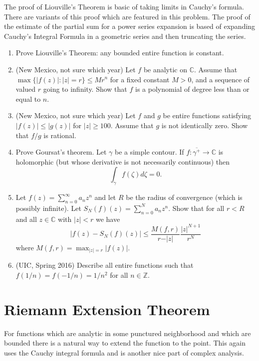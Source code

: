 \documentclass[a4paper,10pt]{article}
\newcommand{\ZZ}{\mathbb{Z}}
\newcommand{\CC}{\mathbb{C}}
\begin{document}
The proof of Liouville's Theorem is basic of taking limits in Cauchy's formula. 
There are variants of this proof which are featured in this problem.
The proof of the estimate of the partial sum for a power series expansion is based of expanding Cauchy's Integral Formula in a geometric series and then truncating the series. 

\begin{enumerate}
	\item Prove Liouville's Theorem: any bounded entire function is constant. 

	\item (New Mexico, not sure which year) %
	Let $f$ be analytic on $\CC$. 
	Assume that $\max \lbrace \vert f(z) \vert : \vert z \vert = r \rbrace \leq M r^n$ for a fixed constant $M>0$, and a sequence of valued $r$ going to infinity. 
	Show that $f$ is a polynomial of degree less than or equal to $n$. 
	
	\item (New Mexico, not sure which year) 
	Let $f$ and $g$ be entire functions satisfying $\vert f(z) \vert \leq \vert g(z) \vert$ for $\vert z \vert \geq 100$. Assume that $g$ is not identically zero. Show that $f/g$ is rational. 
	
	\item Prove Goursat's theorem. Let $\gamma$ be a simple contour. If $f:\overline{\gamma^+} \to \CC$ is holomorphic (but whose derivative is not necessarily continuous) then 
	$$ \int_{\gamma} f(\zeta) d\zeta = 0. $$
	
	
	\item Let $f(z) = \sum_{n=0}^{\infty}a_nz^n$ and let $R$ be the radius of convergence (which is possibly infinite). Let $S_N(f)(z) = \sum_{n=0}^N a_n z^n$. 
	Show that for all $r<R$ and all $z \in \CC$ with $\vert z \vert < r$ we have 
	$$ \vert f(z) - S_N(f)(z) \vert \leq \frac{M(f,r)}{r - \vert z \vert} \frac{\vert z \vert^{N+1}}{r^{N}} $$ 
	where $ M(f,r) = \max_{\vert z \vert = r} \vert f(z) \vert. $
	
	\item (UIC, Spring 2016)
	Describe all entire functions such that $f(1/n) = f(-1/n) = 1/n^2$ for all $n\in \ZZ$.
	
\end{enumerate}

\section{Riemann Extension Theorem}
For functions which are analytic in some punctured neighborhood and which are bounded there is a natural way to extend the function to the point. This again uses the Cauchy integral formula and is another nice part of complex analysis.
\end{document}
